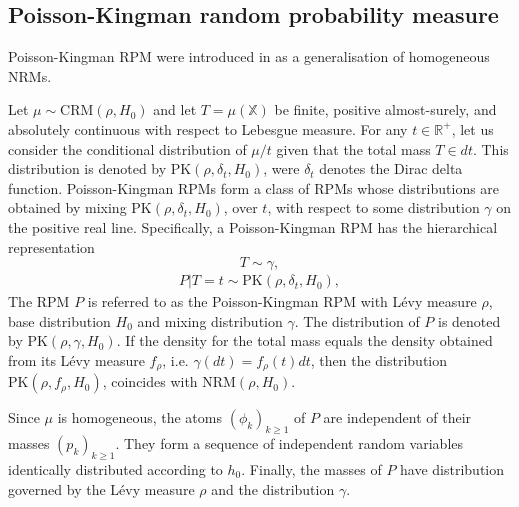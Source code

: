 
\subsection{Poisson-Kingman random probability measure}
Poisson-Kingman \gls{RPM} were introduced in \cite{pitman2003pkp} as a generalisation of homogeneous NRMs. \\

\begin{definition} \label{def:PKRPM}
Let $\mu \sim \text{CRM}(\rho, H_0)$ and let $T = \mu(\mathbb{X})$ be finite, positive almost-surely, and absolutely continuous with respect to Lebesgue measure. For any $t \in \mathbb{R}^+$, let us consider the conditional distribution of $\mu/t$ given that the total mass $T \in dt$. This distribution is denoted by $\text{PK}(\rho, \delta_t , H_0)$, were $\delta_t$ denotes the Dirac delta function. Poisson-Kingman \glspl{RPM} form a class of \glspl{RPM} whose distributions are obtained by mixing $\text{PK}(\rho, \delta_t , H_0)$, over $t$, with respect to some distribution  $\gamma$ on the positive real line. Specifically, a Poisson-Kingman \gls{RPM} has the hierarchical representation
$$T \sim \gamma, $$
\vspace{-2em}
\begin{gather} \label{eq:PK}
P|T=t \sim \text{PK}(\rho, \delta_t, H_0),
\end{gather}
The \gls{RPM} $P$ is referred to as the Poisson-Kingman \gls{RPM} with Lévy measure $\rho$, base distribution $H_0$ and mixing distribution $\gamma$. The distribution of $P$ is denoted by $\text{PK}(\rho, \gamma , H_0)$. If the density for the total mass equals the density obtained from its Lévy measure $f_\rho$, i.e. $\gamma(dt) = f_\rho(t) dt$, then the distribution $\text{PK}(\rho, f_\rho , H_0)$, coincides with $\text{NRM} (\rho, H_0)$.
\end{definition}

Since $\mu$ is homogeneous, the atoms $\left(\phi_k \right)_{k \ge 1}$ of $P$ are independent of their masses $\left(p_k \right)_{k \ge 1}$. They form a sequence of independent random variables identically distributed according to $h_0$. Finally, the masses of $P$ have distribution governed by the Lévy measure $\rho$ and the distribution $\gamma$.

